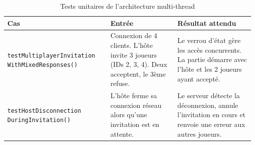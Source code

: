 \documentclass[a4paper]{article}
\begin{document}
\begin{table}[H]
    \centering
    \small
    \begin{tabular}{p{4.5cm} p{4.5cm} p{5.5cm}}
        \toprule
        \textbf{Cas} & \textbf{Entrée} & \textbf{Résultat attendu} \\
        \midrule
        \texttt{testMultiplayerInvitation WithMixedResponses()} & Connexion de 4 clients. L'hôte invite 3 joueurs (IDs 2, 3, 4). Deux acceptent, le 3ème refuse. & Le verrou d'état gère les accès concurrents. La partie démarre avec l'hôte et les 2 joueurs ayant accepté. \\
        \midrule
        \texttt{testHostDisconnection DuringInvitation()} & L'hôte ferme sa connexion réseau alors qu'une invitation est en attente. & Le serveur détecte la déconnexion, annule l'invitation en cours et renvoie une erreur aux autres joueurs. \\
        \bottomrule
    \end{tabular}
    \caption{Tests unitaires de l'architecture multi-thread}
\end{table}
\end{document}
